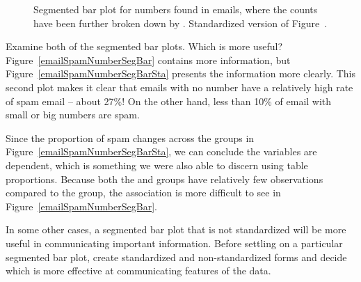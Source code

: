 \begin{figure}
\centering
{}
\caption{ Segmented bar plot for numbers found in emails, where the counts have been further broken down by .  Standardized version of Figure~.}
\label{emailSpamNumberSegBarPlot}
\end{figure}

\begin{example}{Examine both of the segmented bar plots. Which is more useful?}
Figure~\ref{emailSpamNumberSegBar} contains more information, but Figure~\ref{emailSpamNumberSegBarSta} presents the information more clearly. This second plot makes it clear that emails with no number have a relatively high rate of spam email -- about 27\%! On the other hand, less than 10\% of email with small or big numbers are spam.
\end{example}

Since the proportion of spam changes across the groups in Figure~\ref{emailSpamNumberSegBarSta}, we can conclude the variables are dependent, which is something we were also able to discern using table proportions. Because both the  and  groups have relatively few observations compared to the  group, the association is more difficult to see in Figure~\ref{emailSpamNumberSegBar}.

In some other cases, a segmented bar plot that is not standardized will be more useful in communicating important information. Before settling on a particular segmented bar plot, create standardized and non-standardized forms and decide which is more effective at communicating features of the data.

